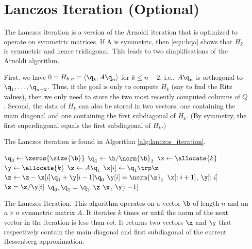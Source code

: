 \section*{Lanczos Iteration (Optional)} %

The Lanczos iteration is a version of the Arnoldi iteration that is optimized to operate on symmetric matrices.
If A is symmetric, then \eqref{equ:hqa} shows that $H_k$ is symmetric and hence tridiagonal.
This leads to two simplifications of the Arnoldi algorithm.

First, we have $0=H_{k, n}=\langle \q_k, A\q_n \rangle$ for $k \leq n-2$; i.e., $A\q_n$ is orthogonal to $\q_1, \ldots, \q_{n-2}$.
Thus, if the goal is only to compute $H_k$ (say to find the Ritz values), then we only need to store the two most recently computed columns of $Q$.
Second, the data of $H_k$ can also be stored in two vectors, one containing the main diagonal and one containing the first subdiagonal of $H_k$.
(By symmetry, the first superdiagonal equals the first subdiagonal of $H_k$.)

The Lanczos iteration is found in Algorithm \ref{alg:lanczos_iteration}.

\begin{algorithm}
\begin{algorithmic}[1]
	\State $\q_0 \gets \zeros{\size{\b}}$								
	\State $\q_1 \gets \b/\norm{\b}_2$
	\State $\x \gets \allocate{k}$
	\State $\y \gets \allocate{k}$
										
		\State $\z \gets A\q_1$					
		\State $\x[i] \gets \q_1\trp \z$				
		\State $\z \gets \z - \x[i] \q_1 + \y[i-1] \q_0$				
		\State $\y[i] = \norm{\z}_2$						
										
			\State {} $\x[: i+1]$, $\y[: i]$
		\EndIf
		\State $\z = \z/ \y[i]$
		\State $\q_0, \q_1 = \q_1, \z$						
	\EndFor
	\State {} $\x$, $\y[: -1]$
\EndProcedure
\end{algorithmic}
\caption{The Lanczos Iteration. This algorithm operates on a vector $\b$ of length $n$ and an $n \times n$ symmetric matrix $A$. It iterates $k$ times or until the norm of the next vector in the iteration is less than $tol$. It returns two vectors $\x$ and $\y$ that respectively contain the main diagonal and first subdiagonal of the current Hessenberg approximation.}
\label{alg:lanczos_iteration}
\end{algorithm}

